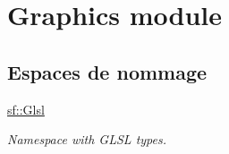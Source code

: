\hypertarget{group__graphics}{}\section{Graphics module}
\label{group__graphics}
\subsection*{Espaces de nommage}
\begin{DoxyCompactItemize}
\item 
 \hyperlink{namespacesf_1_1Glsl}{sf\+::\+Glsl}
\begin{DoxyCompactList}\small\item\em Namespace with G\+L\+SL types. \end{DoxyCompactList}\end{DoxyCompactItemize}
